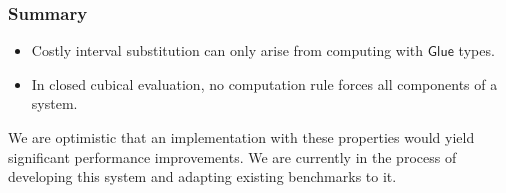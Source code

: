\documentclass[letterpaper]{easychair}
\newcommand{\msf}[1]{\mathsf{#1}}
\begin{document}
\subsubsection*{Summary}

\begin{itemize}
  \item Costly interval substitution can only arise from computing with $\msf{Glue}$ types.
  \item In closed cubical evaluation, no computation rule forces all components of a system.
\end{itemize}
We are optimistic that an implementation with these properties would yield significant
performance improvements. We are currently in the process of developing this system
and adapting existing benchmarks to it.


\end{document}
